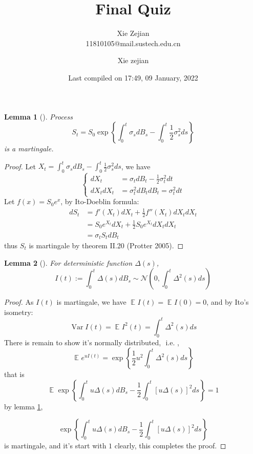 \documentclass[
]{article}
\author{Xie Zejian\\ 11810105@mail.sustech.edu.cn}
\affil{Department of Finance, SUSTech
        }
\title{Final Quiz}
\author{Xie zejian}
\date{Last compiled on 17:49, 09 January, 2022}
\newtheorem{lemma}{Lemma}
\theoremstyle{definition}
\theoremstyle{definition}
\theoremstyle{definition}
\theoremstyle{definition}
\theoremstyle{remark}
\begin{document}
\maketitle

\begin{lemma}[]
\protect\hypertarget{lem:mart}{}\label{lem:mart}Process
\[
S_{t}=S_0 \exp \left\{ \int_{0}^{t} \sigma_{s}dB_{s}-\int_{0}^{t} \frac{1}{2}\sigma^2_{s} ds  \right\}
\]
is a martingale.
\end{lemma}

\begin{proof}
Let \(X_{t}=\int_{0}^{t} \sigma_{s}dB_{s}-\int_{0}^{t} \frac{1}{2}\sigma^2_{s} ds\), we have
\[
\begin{cases}
    dX_{t}&= \sigma_{t}dB_{t}-\frac{1}{2}\sigma^2_{t}dt \\
    dX_{t}dX_{t}&=\sigma^2_{t}dB_{t}dB_{t}=\sigma^2_{t}dt
\end{cases}
\]
Let \(f(x)=S_0 e^{x}\), by Ito-Doeblin formula:
\[
\begin{aligned}
   dS_{t}&=f'(X_{t})dX_{t}+\frac{1}{2}f''(X_{t})dX_{t}dX_{t}
   \\ &= 
   S_0e^{X_{t}}dX_{t}+\frac{1}{2}S_0 e^{X_{t}}dX_{t}dX_{t}
   \\ &= 
   \sigma_{t}S_{t}dB_{t}
\end{aligned}
\]
thus \(S_{t}\) is martingale by theorem II.20 (Protter 2005).
\end{proof}

\begin{lemma}[]
\protect\hypertarget{lem:normal}{}\label{lem:normal}For deterministic function \(\Delta(s)\),
\[
I(t):= \int _{0}^{t} \Delta(s)d B_{s} \sim \mathcal{N}\left( 0, \int _{0}^{t} \Delta^2(s)ds \right)
\]
\end{lemma}

\begin{proof}
As \(I(t)\) is martingale, we have \(\mathop{{}\mathbb{E}}_{}I(t)=\mathop{{}\mathbb{E}}_{}I(0)=0\), and by Ito's isometry:
\[
\mathop{\text{Var}}I(t)=\mathop{{}\mathbb{E}}_{}I^2(t)=\int_{0}^{t} \Delta^2(s)ds 
\]
There is remain to show it's normally distributed, \(\text{ i.e. }\),
\[
\mathop{{}\mathbb{E}}_{}e^{uI(t)}= \exp \left\{  \frac{1}{2} u^2 \int_{0}^{t} \Delta^2(s)ds   \right\}
\]
that is
\[
\mathop{{}\mathbb{E}}_{}\exp \left\{ \int_{0}^{t} u \Delta(s)dB_{s}-  \frac{1}{2}  \int_{0}^{t} \left[ u\Delta(s)\right]^2ds   \right\}=1
\]
by lemma \ref{lem:mart},

\[
\exp \left\{ \int_{0}^{t} u \Delta(s)dB_{s}-  \frac{1}{2}  \int_{0}^{t} \left[ u\Delta(s)\right]^2ds   \right\}
\]
is martingale, and it's start with \(1\) clearly, this completes the proof.
\end{proof}
\end{document}
